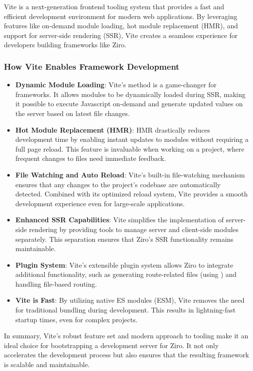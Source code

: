 Vite is a next-generation frontend tooling system that provides a fast and efficient development environment for modern web applications. By leveraging features like on-demand module loading, hot module replacement (HMR), and support for server-side rendering (SSR), Vite creates a seamless experience for developers building frameworks like Ziro.

\subsubsection*{How Vite Enables Framework Development}
\begin{itemize}
	\item \textbf{Dynamic Module Loading}: Vite’s  method is a game-changer for frameworks. It allows modules to be dynamically loaded during SSR, making it possible to execute Javascript on-demand and generate updated values on the server based on latest file changes.
	\item \textbf{Hot Module Replacement (HMR)}: HMR drastically reduces development time by enabling instant updates to modules without requiring a full page reload. This feature is invaluable when working on a project, where frequent changes to files need immediate feedback.
	\item \textbf{File Watching and Auto Reload}: Vite’s built-in file-watching mechanism ensures that any changes to the project’s codebase are automatically detected. Combined with its optimized reload system, Vite provides a smooth development experience even for large-scale applications.
	\item \textbf{Enhanced SSR Capabilities}: Vite simplifies the implementation of server-side rendering by providing tools to manage server and client-side modules separately. This separation ensures that Ziro’s SSR functionality remains maintainable.
	\item \textbf{Plugin System}: Vite’s extensible plugin system allows Ziro to integrate additional functionality, such as generating route-related files (using ) and handling file-based routing.
	\item \textbf{Vite is Fast}: By utilizing native ES modules (ESM), Vite removes the need for traditional bundling during development. This results in lightning-fast startup times, even for complex projects.
\end{itemize}

In summary, Vite’s robust feature set and modern approach to tooling make it an ideal choice for bootstrapping a development server for Ziro. It not only accelerates the development process but also ensures that the resulting framework is scalable and maintainable.

